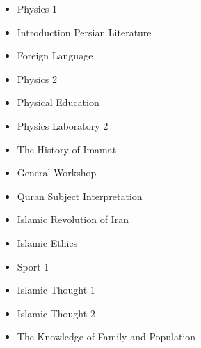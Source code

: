 \documentclass[
fontsize=11pt,
paper=a4,
parskip=half,
enlargefirstpage=off,    %
fromalign=right,        %
fromphone=on,           %
fromemail=on,
fromrule=off,           %
addrfield=off,          %
backaddress=on,         %
subject=beforeopening,  %
locfield=narrow,        %
foldmarks=off,          %
open=any
]{scrartcl}
\begin{document}
\begin{itemize}
\item Physics 1
\item Introduction Persian Literature
\item Foreign Language
\item Physics 2
\item Physical Education
\item Physics Laboratory 2
\item The History of Imamat
\item General Workshop
\item Quran Subject Interpretation
\item Islamic Revolution of Iran
\item Islamic Ethics
\item Sport 1
\item Islamic Thought 1
\item Islamic Thought 2
\item The Knowledge of Family and Population
\end{itemize}
\end{document}
